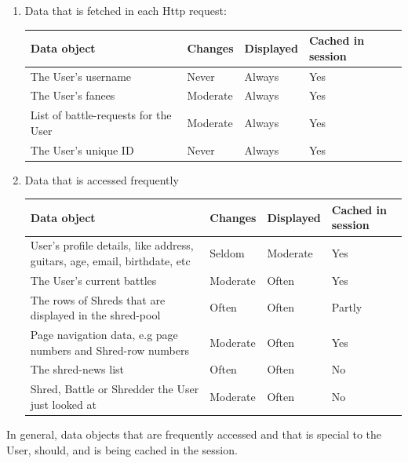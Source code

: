 	\begin {enumerate}
	\item{} Data that is fetched in each Http request:
	
	\begin{tabularx}{\linewidth}{ | X  |l | l | l |}
	    \hline
	    \textbf{Data object} & \textbf{Changes}  & \textbf{Displayed} & \textbf{Cached in session}\\ \hline
	    The User's username &  Never & Always & Yes\\ \hline
	    The User's fanees & Moderate & Always & Yes\\ \hline
	    List of battle-requests for the User & Moderate & Always & Yes \\ \hline
	    The User's unique ID & Never & Always & Yes \\ \hline
	    \end{tabularx}
	
	\item{} Data that is accessed  frequently
	
	  \begin{center}
	\begin{tabularx}{\linewidth}{ | X  |l | l | l |}
	    \hline
	    \textbf{Data object} & \textbf{Changes} & \textbf{Displayed} & \textbf{Cached in session} \\ \hline
	    User's profile details, like address, guitars, age, email, birthdate, etc & Seldom & Moderate & Yes \\ \hline
	    The User's current battles & Moderate & Often & Yes \\ \hline
	    
	    The rows of Shreds that are displayed in the shred-pool & Often & Often & Partly \\ \hline
	    
	     Page navigation data, e.g page numbers and Shred-row numbers & Moderate & Often & Yes\\ \hline
	    The shred-news list & Often & Often & No\\ \hline

    	    Shred, Battle or Shredder the User just looked at & Moderate & Often & No\\ \hline
	   \end{tabularx}
	\end{center}
	
	\end{enumerate}	
	
In general, data objects that are frequently accessed and that is special to the User, should, and is being cached in the session. 

